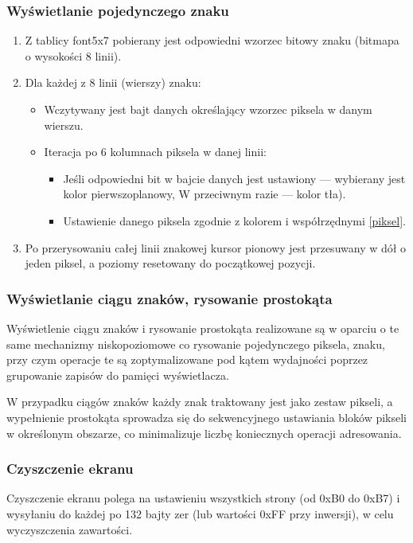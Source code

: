 \subsubsection{Wyświetlanie pojedynczego znaku}
\begin{enumerate}
    \item Z tablicy font5x7 pobierany jest odpowiedni wzorzec bitowy znaku (bitmapa o wysokości 8 linii).
    \item Dla każdej z 8 linii (wierszy) znaku:
    \begin{itemize}
        \item Wczytywany jest bajt danych określający wzorzec piksela w danym wierszu.
        \item Iteracja po 6 kolumnach piksela w danej linii:
        \begin{itemize}
            \item Jeśli odpowiedni bit w bajcie danych jest ustawiony — wybierany jest kolor pierwszoplanowy, W przeciwnym razie — kolor tła).
            \item Ustawienie danego piksela zgodnie z kolorem i współrzędnymi \ref{piksel}.
        \end{itemize}
    \end{itemize}
    \item Po przerysowaniu całej linii znakowej kursor pionowy jest przesuwany w dół o jeden piksel, a poziomy resetowany do początkowej pozycji.
\end{enumerate}

\subsubsection{Wyświetlanie ciągu znaków, rysowanie prostokąta}

Wyświetlenie ciągu znaków i rysowanie prostokąta realizowane są w oparciu o te same mechanizmy niskopoziomowe co rysowanie pojedynczego piksela, znaku, przy czym operacje te są zoptymalizowane pod kątem wydajności poprzez grupowanie zapisów do pamięci wyświetlacza.

W przypadku ciągów znaków każdy znak traktowany jest jako zestaw pikseli, a wypełnienie prostokąta sprowadza się do sekwencyjnego ustawiania bloków pikseli w określonym obszarze, co minimalizuje liczbę koniecznych operacji adresowania.

\subsubsection{Czyszczenie ekranu}
Czyszczenie ekranu polega na ustawieniu wszystkich strony (od 0xB0 do 0xB7) i wysyłaniu do każdej po 132 bajty zer (lub wartości 0xFF przy inwersji), w celu wyczyszczenia zawartości.


